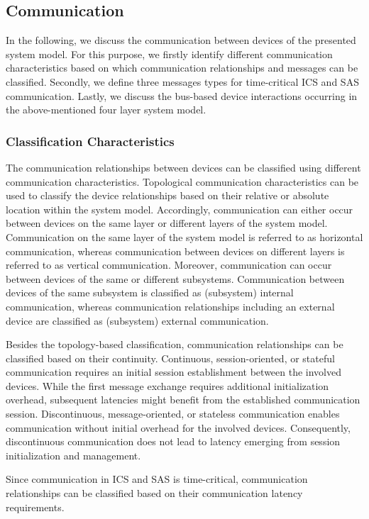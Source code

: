 \subsection{Communication}
\label{sec:approach:system_model:communication}
In the following, we discuss the communication between devices of the presented system model.
For this purpose, we firstly identify different communication characteristics based on which communication relationships and messages can be classified.
Secondly, we define three messages types for time-critical ICS and SAS communication.
Lastly, we discuss the bus-based device interactions occurring in the above-mentioned four layer system model.

\subsubsection{Classification Characteristics}
The communication relationships between devices can be classified using different communication characteristics.
Topological communication characteristics can be used to classify the device relationships based on their relative or absolute location within the system model.
Accordingly, communication can either occur between devices on the same layer or different layers of the system model.
Communication on the same layer of the system model is referred to as horizontal communication, whereas communication between devices on different layers is referred to as vertical communication.
Moreover, communication can occur between devices of the same or different subsystems.
Communication between devices of the same subsystem is classified as (subsystem) internal communication, whereas communication relationships including an external device are classified as (subsystem) external communication.

Besides the topology-based classification, communication relationships can be classified based on their continuity.
Continuous, session-oriented, or stateful communication requires an initial session establishment between the involved devices.
While the first message exchange requires additional initialization overhead, subsequent latencies might benefit from the established communication session.
Discontinuous, message-oriented, or stateless communication enables communication without initial overhead for the involved devices.
Consequently, discontinuous communication does not lead to latency emerging from session initialization and management.

Since communication in ICS and SAS is time-critical, communication relationships can be classified based on their communication latency requirements.
\todo{\dots}

